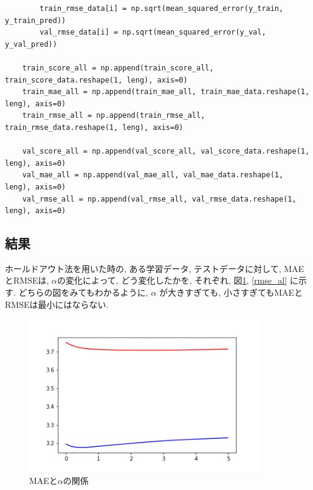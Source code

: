 \documentclass{jsarticle}
\begin{document}
\begin{verbatim}
        train_rmse_data[i] = np.sqrt(mean_squared_error(y_train, y_train_pred))
        val_rmse_data[i] = np.sqrt(mean_squared_error(y_val, y_val_pred))
        
    train_score_all = np.append(train_score_all, train_score_data.reshape(1, leng), axis=0)
    train_mae_all = np.append(train_mae_all, train_mae_data.reshape(1, leng), axis=0)
    train_rmse_all = np.append(train_rmse_all, train_rmse_data.reshape(1, leng), axis=0)
    
    val_score_all = np.append(val_score_all, val_score_data.reshape(1, leng), axis=0)
    val_mae_all = np.append(val_mae_all, val_mae_data.reshape(1, leng), axis=0)
    val_rmse_all = np.append(val_rmse_all, val_rmse_data.reshape(1, leng), axis=0)

\end{verbatim}
\normalsize

\subsection{結果}
ホールドアウト法を用いた時の, ある学習データ, テストデータに対して, MAEとRMSEは, $\alpha$の変化によって, どう変化したかを, それぞれ, 図\ref{mae_al}, \ref{rmse_al} に示す.
どちらの図をみてもわかるように, $\alpha$ が大きすぎても, 小さすぎてもMAEとRMSEは最小にはならない.

 
\begin{figure}
\begin{center}
\label{mae_al}
\caption{MAEと$\alpha$の関係}
\includegraphics[width=10cm]{prog/mae.png}
\end{center}
\end{figure}
\end{document}
